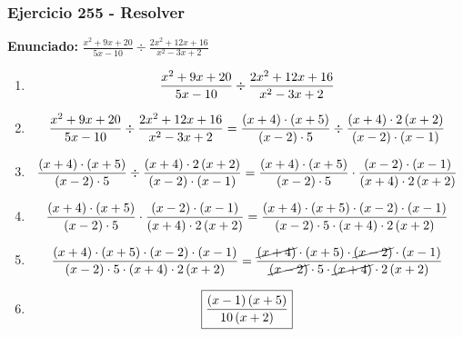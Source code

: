 \documentclass[11pt,a4paper]{article}
\newcommand{\fitmath}[1]{%
\[
\setbox0=\hbox{$\displaystyle #1$}%
\ifdim\wd0>\linewidth
\resizebox{\linewidth}{!}{$\displaystyle #1$}%
\else
#1%
\fi
\]
}
\begin{document}
\subsubsection*{Ejercicio 255 - Resolver}
\textbf{Enunciado:} $ \frac{x^{2} + 9 x + 20}{5 x - 10} \div \frac{2 x^{2} + 12 x + 16}{x^{2} - 3 x + 2} $\par
\begin{enumerate}[leftmargin=2em]
\item \fitmath{\frac{x^{2} + 9 x + 20}{5 x - 10} \div \frac{2 x^{2} + 12 x + 16}{x^{2} - 3 x + 2}}
\item \fitmath{\frac{x^{2} + 9 x + 20}{5 x - 10} \div \frac{2 x^{2} + 12 x + 16}{x^{2} - 3 x + 2}= \frac{\left(x + 4\right)\cdot \left(x + 5\right)}{\left(x - 2\right)\cdot 5} \div \frac{\left(x + 4\right)\cdot 2 \left(x + 2\right)}{\left(x - 2\right)\cdot \left(x - 1\right)}}
\item \fitmath{\frac{\left(x + 4\right)\cdot \left(x + 5\right)}{\left(x - 2\right)\cdot 5}\div \frac{\left(x + 4\right)\cdot 2 \left(x + 2\right)}{\left(x - 2\right)\cdot \left(x - 1\right)}= \frac{\left(x + 4\right)\cdot \left(x + 5\right)}{\left(x - 2\right)\cdot 5}\cdot \frac{\left(x - 2\right)\cdot \left(x - 1\right)}{\left(x + 4\right)\cdot 2 \left(x + 2\right)}}
\item \fitmath{\frac{\left(x + 4\right)\cdot \left(x + 5\right)}{\left(x - 2\right)\cdot 5}\cdot \frac{\left(x - 2\right)\cdot \left(x - 1\right)}{\left(x + 4\right)\cdot 2 \left(x + 2\right)}= \frac{\left(x + 4\right)\cdot \left(x + 5\right)\cdot \left(x - 2\right)\cdot \left(x - 1\right)}{\left(x - 2\right)\cdot 5\cdot \left(x + 4\right)\cdot 2 \left(x + 2\right)}}
\item \fitmath{\frac{\left(x + 4\right)\cdot \left(x + 5\right)\cdot \left(x - 2\right)\cdot \left(x - 1\right)}{\left(x - 2\right)\cdot 5\cdot \left(x + 4\right)\cdot 2 \left(x + 2\right)}= \frac{\cancel{\left(x + 4\right)}\cdot \left(x + 5\right)\cdot \cancel{\left(x - 2\right)}\cdot \left(x - 1\right)}{\cancel{\left(x - 2\right)}\cdot 5\cdot \cancel{\left(x + 4\right)}\cdot 2 \left(x + 2\right)}}
\item \fitmath{\boxed{\frac{\left(x - 1\right) \left(x + 5\right)}{10 \left(x + 2\right)}}}
\end{enumerate}

\vspace{0.12cm}
\end{document}
